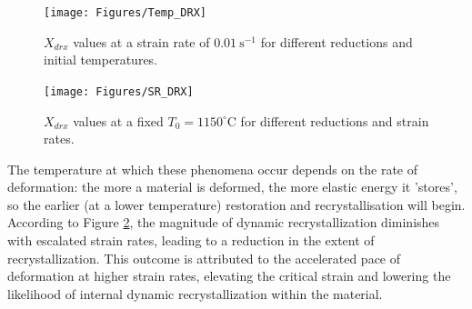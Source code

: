 \documentclass[metals,article,submit,pdftex,moreauthors]{Definitions/mdpi}
\begin{document}
\begin{figure}[H]
\texttt{[image: Figures/Temp\_DRX]}
\caption{$X_{drx}$ values at a strain rate of $0.01~\text{s}^{-1}$ for different reductions and initial temperatures.}
\label{fig:TempEffect}
\end{figure}
\begin{figure}[H]
\texttt{[image: Figures/SR\_DRX]}
\caption{$X_{drx}$ values at a fixed $T_0=1150^\circ$C for different reductions and strain rates.}
\label{fig:SREffect}
\end{figure}

The temperature at which these phenomena occur depends on the rate of deformation: the more a material is deformed, the more elastic energy it 'stores', so the earlier (at a lower temperature) restoration and recrystallisation will begin. According to Figure \ref{fig:SREffect}, the magnitude of dynamic recrystallization diminishes with escalated strain rates, leading to a reduction in the extent of recrystallization. This outcome is attributed to the accelerated pace of deformation at higher strain rates, elevating the critical strain and lowering the likelihood of internal dynamic recrystallization within the material.

\end{document}

